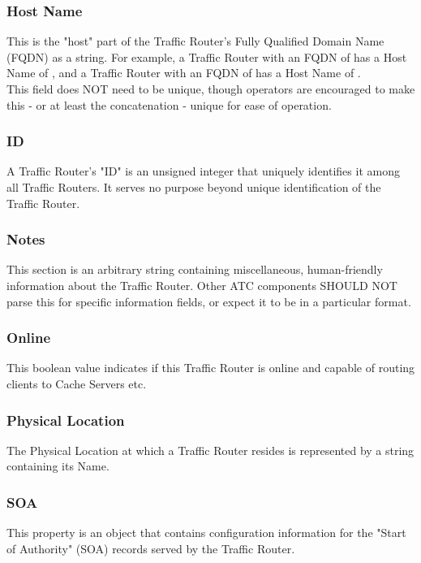 \subsubsection{Host Name}
This is the "host" part of the Traffic Router's Fully Qualified Domain Name
(FQDN) as a string. For example, a Traffic Router with an FQDN of
 has a Host Name of , and a Traffic Router with an
FQDN of  has a Host Name of
.\\
This field does NOT need to be unique, though operators are encouraged to make
this - or at least the concatenation  - unique
for ease of operation.

\subsubsection{ID}
A Traffic Router's "ID" is an unsigned integer that uniquely identifies it among
all Traffic Routers. It serves no purpose beyond unique identification of the
Traffic Router.

\subsubsection{Notes}
This section is an arbitrary string containing miscellaneous, human-friendly
information about the Traffic Router. Other ATC components SHOULD NOT parse this
for specific information fields, or expect it to be in a particular format.

\subsubsection{Online}
This boolean value indicates if this Traffic Router is online and capable of
routing clients to Cache Servers etc.

\subsubsection{Physical Location}
The Physical Location at which a Traffic Router resides is represented by a
string containing its Name.

\subsubsection{SOA}
This property is an object that contains configuration information for the
"Start of Authority" (SOA) records served by the Traffic Router.


